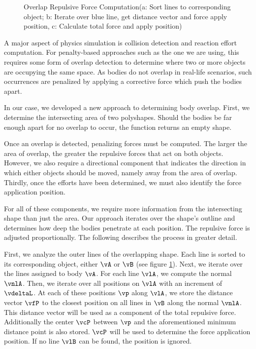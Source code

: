 \begin{figure}
	\centering
	
	\caption{Overlap Repulsive Force Computation(a: Sort lines to corresponding object; b: Iterate over blue line, get distance vector and force apply position, c: Calculate total force and apply position)}
	\label{fig:overlap_computation}
\end{figure}

A major aspect of physics simulation is collision detection and reaction effort computation. For penalty-based approaches such as the one we are using, this requires some form of overlap detection to determine where two or more objects are occupying the same space. As bodies do not overlap in real-life scenarios, such occurrences are penalized by applying a corrective force which push the bodies apart.

In our case, we developed a new approach to determining body overlap. First, we determine the intersecting area of two polyshapes. Should the bodies be far enough apart for no overlap to occur, the function returns an empty shape.

Once an overlap is detected, penalizing forces must be computed. The larger the area of overlap, the greater the repulsive forces that act on both objects. However, we also require a directional component that indicates the direction in which either objects should be moved, namely away from the area of overlap. 
Thirdly, once the efforts have been determined, we must also identify the force application position.

For all of these components, we require more information from the intersecting shape than just the area. Our approach iterates over the shape's outline and determines how deep the bodies penetrate at each position. The repulsive force is adjusted proportionally. The following describes the process in greater detail.
 
First, we analyze the outer lines of the overlapping shape. Each line is sorted to its corresponding object, either $\vA$ or $\vB$ (see figure \ref{fig:overlap_computation}).
Next, we iterate over the lines assigned to body $\vA$. For each line $\vlA$, we compute the normal $\vnlA$. Then, we iterate over all positions on $\vlA$ with an increment of $\vdeltaL$. At each of these positions $\vp$ along $\vlA$, we store the distance vector $\vfP$ to the closest position on all lines in $\vB$ along the normal $\vnlA$. This distance vector will be used as a component of the total repulsive force. Additionally the center $\vcP$ between $\vp$ and the aforementioned minimum distance point is also stored. $\vcP$ will be used to determine the force application position. If no line $\vlB$ can be found, the position is ignored.

